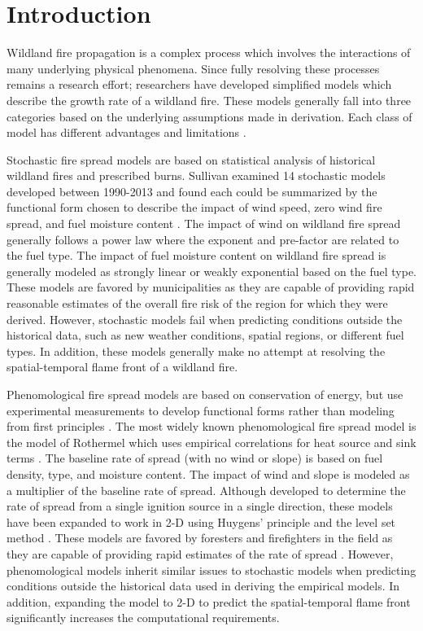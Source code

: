 \documentclass[smallcondensed]{svjour3}     %
\begin{document}
\section{Introduction}
\label{intro}

Wildland fire propagation is a complex process which involves the
interactions of many underlying physical phenomena. Since fully
resolving these processes remains a research effort; researchers
have developed simplified models which describe the growth rate
of a wildland fire. These models generally fall into three
categories based on the underlying assumptions made in
derivation.
Each class of model has different advantages and limitations
\cite{weber1991modelling,sullivan2007a,sullivan2007b}.

Stochastic fire spread models are based on statistical analysis of
historical wildland fires and prescribed burns. Sullivan examined 14
stochastic models developed between 1990-2013 and found each could be
summarized by the functional form chosen to describe the impact of wind speed,
zero wind fire spread, and fuel moisture content \cite{sullivan2007b}.
The impact of wind on wildland fire spread generally follows a power law
where the exponent and pre-factor are related to the fuel type. The
impact of fuel moisture content on wildland fire spread is generally
modeled as strongly linear or weakly exponential based on the fuel type.
These models are favored by municipalities as they are capable of
providing rapid reasonable estimates of the overall fire risk of the
region for which they were derived. However, stochastic models fail when
predicting conditions outside the historical data, such as new weather
conditions, spatial regions, or different fuel types. In addition, these
models generally make no attempt at resolving the spatial-temporal flame
front of a wildland fire.

Phenomological fire spread models are based on conservation of
energy, but use experimental measurements to develop functional forms
rather than modeling from first principles \cite{weber1991modelling,sullivan2007b}.
The most widely
known phenomological fire spread model is the model of Rothermel
\cite{rothermel1972mathematical,scott2005standard} which uses
empirical correlations for heat source and sink terms \cite{weber1991modelling}.
The baseline rate of spread (with no wind or slope) is based on fuel density,
type, and moisture content. The impact of wind and slope is modeled as a multiplier
of the baseline rate of spread. Although developed to determine the rate of spread
from a single ignition source in a single direction, these models have been expanded
to work in 2-D using Huygens' principle \cite{finney1999mechanistic,finney1998farsite}
and the level set method \cite{rehm2009fire,lautenberger2013wildland}.
These models are favored by foresters and
firefighters in the field as they are capable of providing rapid estimates
of the rate of spread \cite{simeoni2015wildland}. However, phenomological models
inherit similar issues to stochastic models when predicting conditions
outside the historical data used in deriving the empirical models. In addition,
expanding the model to 2-D to predict the spatial-temporal flame front significantly
increases the computational requirements.
\end{document}
